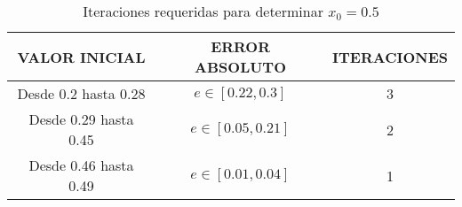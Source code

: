 \begin{table}
\end{table}
\begin{table}[H]
\begin{center}
\begin{tabular}{|c|c|c|}

   \hline
   \textbf{VALOR INICIAL}  & \textbf{ERROR ABSOLUTO}  & \textbf{ITERACIONES} \\ \hline
   Desde 0.2 hasta 0.28    & $e \in [0.22, 0.3]$      & 3                    \\ \hline
   Desde 0.29 hasta 0.45   & $e \in [0.05, 0.21]$     & 2                    \\ \hline    
   Desde 0.46 hasta 0.49   & $e \in [0.01, 0.04]$     & 1                    \\ \hline
   
\end{tabular}
\end{center}
\caption{Iteraciones requeridas para determinar $x_{0} = 0.5$}
\label{itertable}
\end{table}
